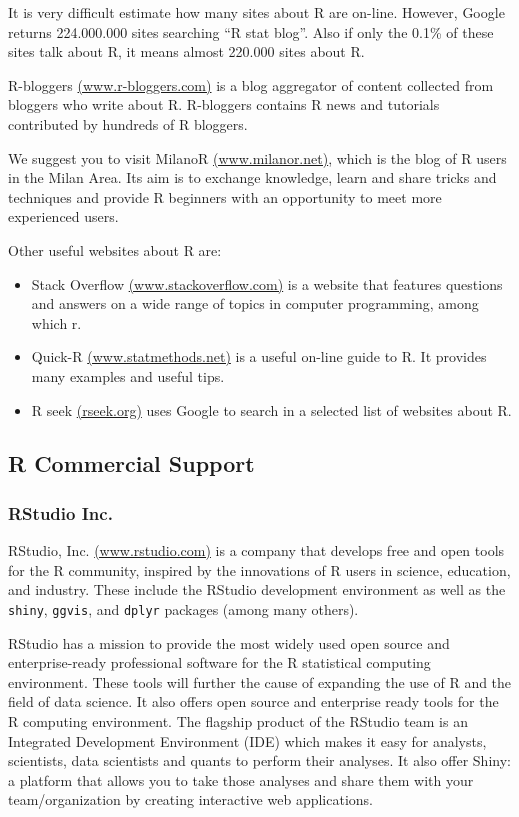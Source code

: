 \documentclass[]{book}
\providecommand{\tightlist}{%
  \setlength{\itemsep}{0pt}\setlength{\parskip}{0pt}}
\def\tightlist{}
\begin{document}
It is very difficult estimate how many sites about R are on-line.
However, Google returns 224.000.000 sites searching ``R stat blog''.
Also if only the 0.1\% of these sites talk about R, it means almost
220.000 sites about R.

R-bloggers \href{http://www.r-bloggers.com/}{(www.r-bloggers.com)} is a
blog aggregator of content collected from bloggers who write about R.
R-bloggers contains R news and tutorials contributed by hundreds of R
bloggers.

We suggest you to visit MilanoR
\href{http://www.milanor.net/}{(www.milanor.net)}, which is the blog of
R users in the Milan Area. Its aim is to exchange knowledge, learn and
share tricks and techniques and provide R beginners with an opportunity
to meet more experienced users.

Other useful websites about R are:

\begin{itemize}
\tightlist
\item
  Stack Overflow
  \href{http://stackoverflow.com/}{(www.stackoverflow.com)} is a website
  that features questions and answers on a wide range of topics in
  computer programming, among which r.
\item
  Quick-R \href{http://www.statmethods.net/}{(www.statmethods.net)} is a
  useful on-line guide to R. It provides many examples and useful tips.
\item
  R seek \href{http://rseek.org/}{(rseek.org)} uses Google to search in
  a selected list of websites about R.
\end{itemize}

\subsection{R Commercial Support}\label{r-commercial-support}

\subsubsection{RStudio Inc.}\label{rstudio-inc.}

RStudio, Inc. \href{http://www.rstudio.com/}{(www.rstudio.com)} is a
company that develops free and open tools for the R community, inspired
by the innovations of R users in science, education, and industry. These
include the RStudio development environment as well as the
\texttt{shiny}, \texttt{ggvis}, and \texttt{dplyr} packages (among many
others).

RStudio has a mission to provide the most widely used open source and
enterprise-ready professional software for the R statistical computing
environment. These tools will further the cause of expanding the use of
R and the field of data science. It also offers open source and
enterprise ready tools for the R computing environment. The flagship
product of the RStudio team is an Integrated Development Environment
(IDE) which makes it easy for analysts, scientists, data scientists and
quants to perform their analyses. It also offer Shiny: a platform that
allows you to take those analyses and share them with your
team/organization by creating interactive web applications.
\end{document}
